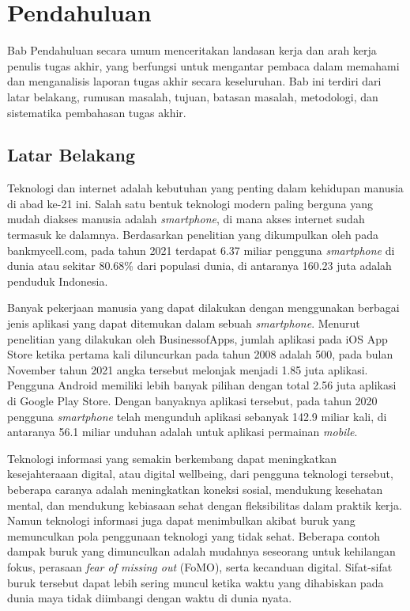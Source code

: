 \chapter{Pendahuluan}

Bab Pendahuluan secara umum menceritakan landasan kerja dan arah kerja penulis tugas akhir, yang berfungsi untuk mengantar pembaca dalam memahami dan menganalisis laporan tugas akhir secara keseluruhan. Bab ini terdiri dari latar belakang, rumusan masalah, tujuan, batasan masalah, metodologi, dan sistematika pembahasan tugas akhir.

\section{Latar Belakang}
\label{sec:latarbelakang}

Teknologi dan internet adalah kebutuhan yang penting dalam kehidupan manusia di abad ke-21 ini. Salah satu bentuk teknologi modern paling berguna yang mudah diakses manusia adalah \emph{smartphone}, di mana akses internet sudah termasuk ke dalamnya. Berdasarkan penelitian yang dikumpulkan oleh \textcite{turner2022howmanysmartphones} pada bankmycell.com, pada tahun 2021 terdapat 6.37 miliar pengguna \emph{smartphone} di dunia atau sekitar 80.68\% dari populasi dunia, di antaranya 160.23 juta adalah penduduk Indonesia.

Banyak pekerjaan manusia yang dapat dilakukan dengan menggunakan berbagai jenis aplikasi yang dapat ditemukan dalam sebuah \emph{smartphone}. Menurut penelitian yang dilakukan oleh BusinessofApps, jumlah aplikasi pada iOS App Store ketika pertama kali diluncurkan pada tahun 2008 adalah 500, pada bulan November tahun 2021 angka tersebut melonjak menjadi 1.85 juta aplikasi. Pengguna Android memiliki lebih banyak pilihan dengan total 2.56 juta aplikasi di Google Play Store. Dengan banyaknya aplikasi tersebut, pada tahun 2020 pengguna \emph{smartphone} telah mengunduh aplikasi sebanyak 142.9 miliar kali, di antaranya 56.1 miliar unduhan adalah untuk aplikasi permainan \emph{mobile}.

Teknologi informasi yang semakin berkembang dapat meningkatkan kesejahteraaan digital, atau digital wellbeing, dari pengguna teknologi tersebut, beberapa caranya adalah meningkatkan koneksi sosial, mendukung kesehatan mental, dan mendukung kebiasaan sehat dengan fleksibilitas dalam praktik kerja. Namun teknologi informasi juga dapat menimbulkan akibat buruk yang memunculkan pola penggunaan teknologi yang tidak sehat. Beberapa contoh dampak buruk yang dimunculkan adalah mudahnya seseorang untuk kehilangan fokus, perasaan \emph{fear of missing out} (FoMO), serta kecanduan digital. Sifat-sifat buruk tersebut dapat lebih sering muncul ketika waktu yang dihabiskan pada dunia maya tidak diimbangi dengan waktu di dunia nyata. \parencite{ALMOURAD2021101778}

